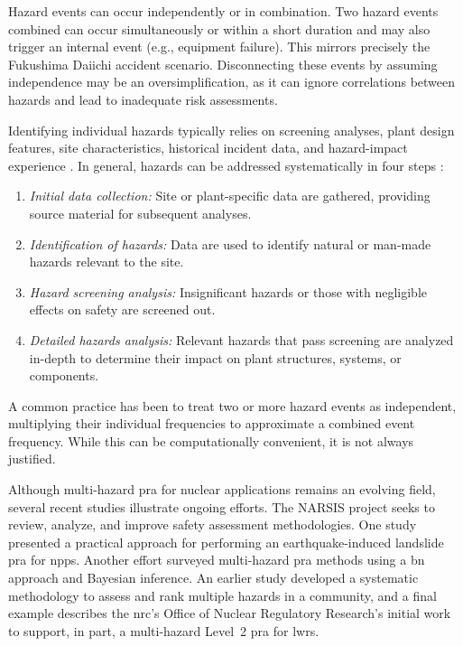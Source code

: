 Hazard events can occur independently or in combination. Two hazard events combined can occur simultaneously or within a short duration and may also trigger an internal event (e.g., equipment failure). This mirrors precisely the Fukushima Daiichi accident scenario. Disconnecting these events by assuming independence may be an oversimplification, as it can ignore correlations between hazards and lead to inadequate risk assessments.

Identifying individual hazards typically relies on screening analyses, plant design features, site characteristics, historical incident data, and hazard-impact experience \cite{Prosek2017Methodology}. In general, hazards can be addressed systematically in four steps \cite{Daniell2019Review}:

\begin{enumerate}
\item \textit{Initial data collection:} Site or plant-specific data are gathered, providing source material for subsequent analyses.
\item \textit{Identification of hazards:} Data are used to identify natural or man-made hazards relevant to the site.
\item \textit{Hazard screening analysis:} Insignificant hazards or those with negligible effects on safety are screened out.
\item \textit{Detailed hazards analysis:} Relevant hazards that pass screening are analyzed in-depth to determine their impact on plant structures, systems, or components.
\end{enumerate}

A common practice has been to treat two or more hazard events as independent, multiplying their individual frequencies to approximate a combined event frequency. While this can be computationally convenient, it is not always justified.

Although multi-hazard \acrshort{pra} for nuclear applications remains an evolving field, several recent studies illustrate ongoing efforts. The NARSIS project \cite{Home} seeks to review, analyze, and improve safety assessment methodologies. One study \cite{Kwag2018Development} presented a practical approach for performing an earthquake-induced landslide \acrshort{pra} for \acrshort{npp}s. Another effort \cite{Kwag2017Probabilistic} surveyed multi-hazard \acrshort{pra} methods using a \acrshort{bn} approach and Bayesian inference. An earlier study \cite{Li2009Ranking} developed a systematic methodology to assess and rank multiple hazards in a community, and a final example \cite{Cooper2013What} describes the \acrshort{nrc}'s Office of Nuclear Regulatory Research's initial work to support, in part, a multi-hazard Level~2 \acrshort{pra} for \acrshort{lwr}s.

